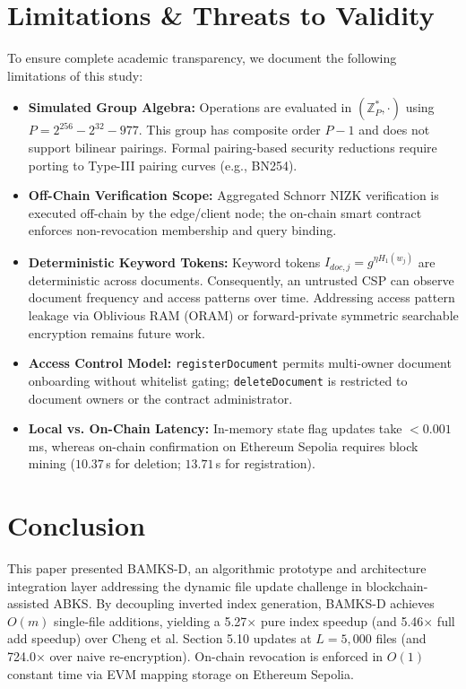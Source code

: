 \documentclass[conference]{IEEEtran}
\begin{document}
\section{Limitations \& Threats to Validity}

To ensure complete academic transparency, we document the following limitations of this study:
\begin{itemize}
    \item \textbf{Simulated Group Algebra:} Operations are evaluated in $(\mathbb{Z}_P^*, \cdot)$ using $P = 2^{256} - 2^{32} - 977$. This group has composite order $P-1$ and does not support bilinear pairings. Formal pairing-based security reductions require porting to Type-III pairing curves (e.g., BN254).
    \item \textbf{Off-Chain Verification Scope:} Aggregated Schnorr NIZK verification is executed off-chain by the edge/client node; the on-chain smart contract enforces non-revocation membership and query binding.
    \item \textbf{Deterministic Keyword Tokens:} Keyword tokens $I_{doc,j} = g^{\eta H_1(w_j)}$ are deterministic across documents. Consequently, an untrusted CSP can observe document frequency and access patterns over time. Addressing access pattern leakage via Oblivious RAM (ORAM) or forward-private symmetric searchable encryption \cite{bost2016sophos} remains future work.
    \item \textbf{Access Control Model:} \texttt{registerDocument} permits multi-owner document onboarding without whitelist gating; \texttt{deleteDocument} is restricted to document owners or the contract administrator.
    \item \textbf{Local vs. On-Chain Latency:} In-memory state flag updates take $< 0.001$\,ms, whereas on-chain confirmation on Ethereum Sepolia requires block mining ($10.37$\,s for deletion; $13.71$\,s for registration).
\end{itemize}

\section{Conclusion}

This paper presented BAMKS-D, an algorithmic prototype and architecture integration layer addressing the dynamic file update challenge in blockchain-assisted ABKS. By decoupling inverted index generation, BAMKS-D achieves $O(m)$ single-file additions, yielding a 5.27$\times$ pure index speedup (and 5.46$\times$ full add speedup) over Cheng et al. Section 5.10 updates at $L=5,000$ files (and 724.0$\times$ over naive re-encryption). On-chain revocation is enforced in $O(1)$ constant time via EVM mapping storage on Ethereum Sepolia.
\end{document}
